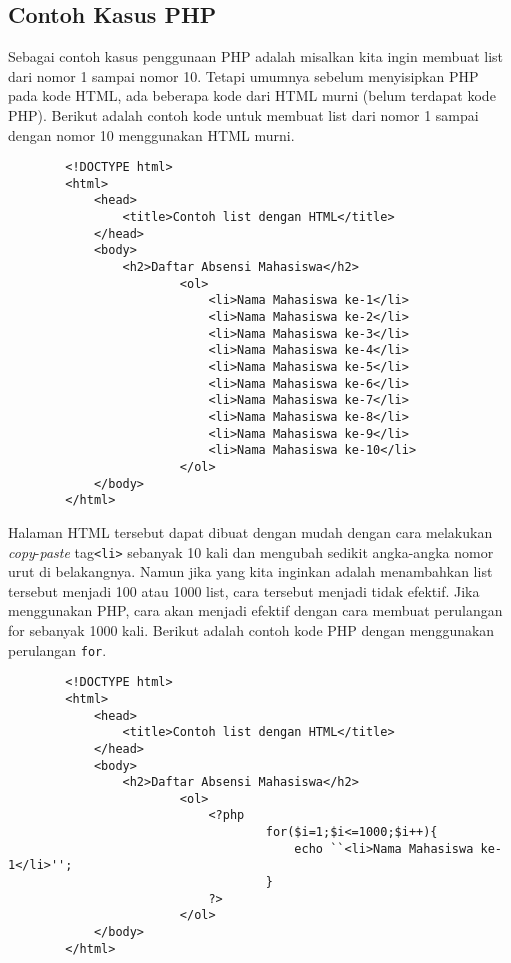 \subsection{Contoh Kasus PHP}
\label{sec:contohphp}
	

	Sebagai contoh kasus penggunaan PHP adalah misalkan kita ingin membuat list dari nomor 1 sampai nomor 10. Tetapi umumnya sebelum menyisipkan PHP pada kode HTML, ada beberapa kode dari HTML murni (belum terdapat kode PHP). Berikut adalah contoh kode untuk membuat list dari nomor 1 sampai dengan nomor 10 menggunakan HTML murni.
	
	\begin{lstlisting}
		<!DOCTYPE html>
		<html>
			<head>
				<title>Contoh list dengan HTML</title>
			</head>
			<body>
				<h2>Daftar Absensi Mahasiswa</h2>
						<ol>
							<li>Nama Mahasiswa ke-1</li>
							<li>Nama Mahasiswa ke-2</li>
							<li>Nama Mahasiswa ke-3</li>
							<li>Nama Mahasiswa ke-4</li>
							<li>Nama Mahasiswa ke-5</li>
							<li>Nama Mahasiswa ke-6</li>
							<li>Nama Mahasiswa ke-7</li>
							<li>Nama Mahasiswa ke-8</li>
							<li>Nama Mahasiswa ke-9</li>
							<li>Nama Mahasiswa ke-10</li>							
						</ol>
			</body>
		</html>
	\end{lstlisting}	
	
	
	Halaman HTML tersebut dapat dibuat dengan mudah dengan cara melakukan \textit{copy}-\textit{paste} tag\texttt{<li>} sebanyak 10 kali dan mengubah sedikit angka-angka nomor urut di belakangnya. Namun jika yang kita inginkan adalah menambahkan list tersebut menjadi 100 atau 1000 list, cara tersebut menjadi tidak efektif. Jika menggunakan PHP, cara akan menjadi efektif dengan cara membuat perulangan for sebanyak 1000 kali. Berikut adalah contoh kode PHP dengan menggunakan perulangan \texttt{for}.

	\begin{lstlisting}
		<!DOCTYPE html>
		<html>
			<head>
				<title>Contoh list dengan HTML</title>
			</head>
			<body>
				<h2>Daftar Absensi Mahasiswa</h2>
						<ol>
							<?php
									for($i=1;$i<=1000;$i++){
										echo ``<li>Nama Mahasiswa ke-1</li>'';
									}
							?>													
						</ol>
			</body>
		</html>
	\end{lstlisting}	

